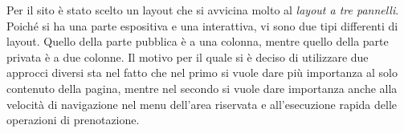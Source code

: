 Per il sito è stato scelto un layout che si avvicina molto al \textit{layout a tre pannelli}.
Poiché si ha una parte espositiva e una interattiva, vi sono due tipi differenti di layout. Quello della parte pubblica è a una colonna, mentre quello della parte
privata è a due colonne. Il motivo per il quale si è deciso di utilizzare due approcci diversi sta nel fatto che nel primo si vuole dare più importanza al solo contenuto della pagina, mentre nel secondo si vuole dare importanza anche alla velocità di navigazione nel menu dell'area riservata e all'esecuzione rapida delle operazioni di prenotazione.